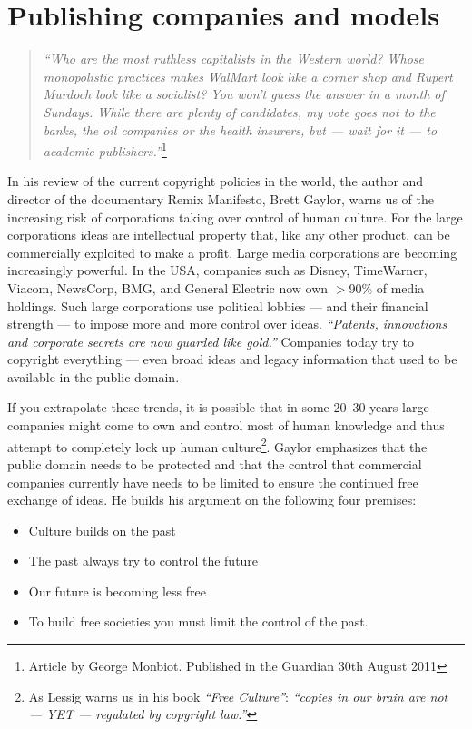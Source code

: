 \documentclass[graybox,envcountchap,sectrefs,UStrade]{svmono}
\begin{document}
\section{Publishing companies and models}\label{sec:publishing_models}

\begin{quote}
    \emph{``Who are the most ruthless capitalists in the Western world? Whose monopolistic practices makes WalMart look like a corner shop and Rupert Murdoch look like a socialist? You won't guess the answer in a month of Sundays. While there are plenty of candidates, my vote goes not to the banks, the oil companies or the health insurers, but --- wait for it --- to academic publishers.''}\footnote{Article by George Monbiot. Published in the Guardian 30th August 2011}
\end{quote}


In his review of the current copyright policies in the world, the author and director of the documentary Remix Manifesto, Brett Gaylor, warns us of the increasing risk of corporations taking over control of human culture. For the large corporations ideas are intellectual property that, like any other product, can be commercially exploited to make a profit. Large media corporations are becoming increasingly powerful. In the USA, companies such as Disney, TimeWarner, Viacom, NewsCorp, BMG, and General Electric now own $>$90\% of media holdings. Such large corporations use political lobbies --- and their financial strength --- to impose more and more control over ideas. \emph{``Patents, innovations and corporate secrets are now guarded like gold.''} Companies today try to copyright everything --- even broad ideas and legacy information that used to be available in the public domain.\par

If you extrapolate these trends, it is possible that in some 20--30 years large companies might come to own and control most of human knowledge and thus attempt to completely lock up human culture\footnote{As Lessig warns us in his book \emph{``Free Culture''}: \emph{``copies in our brain are not --- YET --- regulated by copyright law.''}}. Gaylor emphasizes that the public domain needs to be protected and that the control that commercial companies currently have needs to be limited to ensure the continued free exchange of ideas. He builds his argument on the following four premises:

\begin{itemize}
  \item Culture builds on the past
  \item The past always try to control the future
  \item Our future is becoming less free
  \item To build free societies you must limit the control of the past.
\end{itemize}
\end{document}
